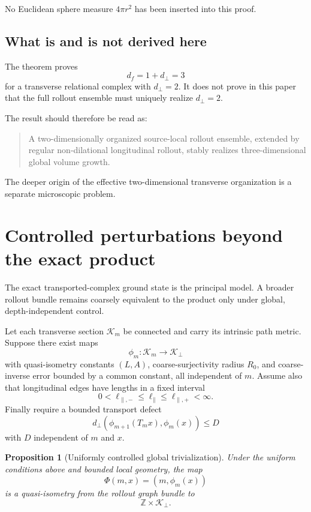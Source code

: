 \documentclass[11pt]{article}
\newtheorem{proposition}{Proposition}
\newcommand{\Z}{\mathbb{Z}}
\newcommand{\cK}{\mathcal{K}}
\begin{document}
No Euclidean sphere measure \(4\pi r^2\) has been inserted into this proof.

\subsection{What is and is not derived here}

The theorem proves
\[
d_f=1+d_\perp=3
\]
for a transverse relational complex with \(d_\perp=2\). It does not prove in this paper that the full rollout ensemble must uniquely realize \(d_\perp=2\).

The result should therefore be read as:

\begin{quote}
A two-dimensionally organized source-local rollout ensemble, extended by regular non-dilational longitudinal rollout, stably realizes three-dimensional global volume growth.
\end{quote}

The deeper origin of the effective two-dimensional transverse organization is a separate microscopic problem.

\section{Controlled perturbations beyond the exact product}

The exact transported-complex ground state is the principal model. A broader rollout bundle remains coarsely equivalent to the product only under global, depth-independent control.

Let each transverse section \(\cK_m\) be connected and carry its intrinsic path metric. Suppose there exist maps
\[
\phi_m:\cK_m\rightarrow\cK_\perp
\]
with quasi-isometry constants \((L,A)\), coarse-surjectivity radius \(R_0\), and coarse-inverse error bounded by a common constant, all independent of \(m\). Assume also that longitudinal edges have lengths in a fixed interval
\[
0<\ell_{\parallel,-}\le \ell_\parallel\le \ell_{\parallel,+}<\infty.
\]
Finally require a bounded transport defect
\begin{equation}
d_\perp\!\left(
\phi_{m+1}(T_mx),
\phi_m(x)
\right)
\le D
\label{eq:defect}
\end{equation}
with \(D\) independent of \(m\) and \(x\).

\begin{proposition}[Uniformly controlled global trivialization]
Under the uniform conditions above and bounded local geometry, the map
\begin{equation}
\Phi(m,x)
=
(m,\phi_m(x))
\end{equation}
is a quasi-isometry from the rollout graph bundle to
\[
\Z\times\cK_\perp.
\]
\end{proposition}
\end{document}
